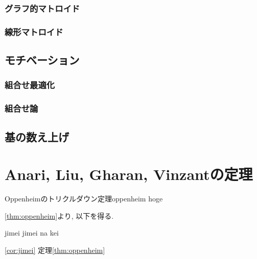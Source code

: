 \documentclass[11pt]{article}
\begin{document}
\subsubsection{グラフ的マトロイド}
\subsubsection{線形マトロイド}
\subsection{モチベーション}
\subsubsection{組合せ最適化}
\subsubsection{組合せ論}
\subsection{基の数え上げ}

\section{Anari, Liu, Gharan, Vinzantの定理}


\begin{theorem}{Oppenheimのトリクルダウン定理}{oppenheim}
    hoge
\end{theorem}
\newpage
\cref{thm:oppenheim}より, 以下を得る.
\begin{corollary}{}{jimei}
    jimei na kei
\end{corollary}
\cref{cor:jimei}
定理\ref{thm:oppenheim}
\end{document}
